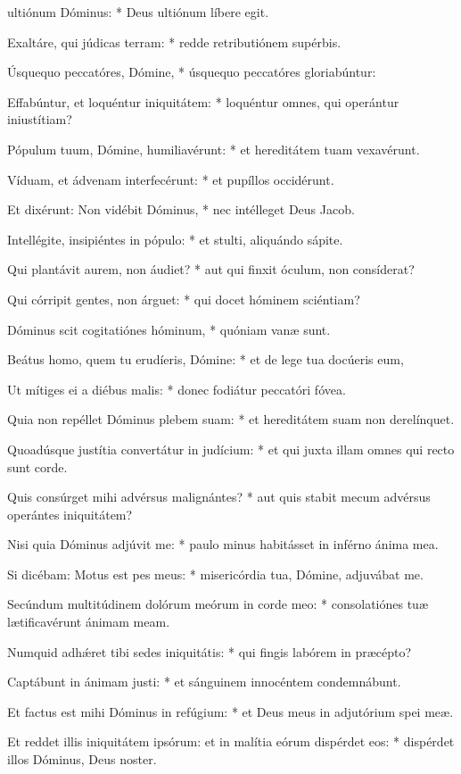 \begin{psalmus}

	 ultiónum Dóminus: * Deus ultiónum líbere egit.

	Exaltáre, qui júdicas terram: * redde retributiónem supérbis.
 
	Úsquequo peccatóres, Dómine, * úsquequo peccatóres gloriabúntur:

	Effabúntur, et loquéntur iniquitátem: * loquéntur omnes, qui operántur iniustítiam?
 
	Pópulum tuum, Dómine, humiliavérunt: * et hereditátem tuam vexavérunt.
 
	Víduam, et ádvenam interfecérunt: * et pupíllos occidérunt.
 
	Et dixérunt: Non vidébit Dóminus, * nec intélleget Deus Jacob.
 
	Intellégite, insipiéntes in pópulo: * et stulti, aliquándo sápite.
 
	Qui plantávit aurem, non áudiet? * aut qui finxit óculum, non consíderat?
 
	Qui córripit gentes, non árguet: * qui docet hóminem sciéntiam?
 
	Dóminus scit cogitatiónes hóminum, * quóniam vanæ sunt.
 
	Beátus homo, quem tu erudíeris, Dómine: * et de lege tua docúeris eum,
 
	Ut mítiges ei a diébus malis: * donec fodiátur peccatóri fóvea.
 
	Quia non repéllet Dóminus plebem suam: * et hereditátem suam non derelínquet.
 
	Quoadúsque justítia convertátur in judícium: * et qui juxta illam omnes qui recto sunt corde.
 
	Quis consúrget mihi advérsus malignántes? * aut quis stabit mecum advérsus operántes iniquitátem?
 
	Nisi quia Dóminus adjúvit me: * paulo minus habitásset in inférno ánima mea.
 
	Si dicébam: Motus est pes meus: * misericórdia tua, Dómine, adjuvábat me.
 
	Secúndum multitúdinem dolórum meórum in corde meo: * consolatiónes tuæ lætificavérunt ánimam meam.
 
	Numquid adhǽret tibi sedes iniquitátis: * qui fingis labórem in præcépto?
 
	Captábunt in ánimam justi: * et sánguinem innocéntem condemnábunt.
 
	Et factus est mihi Dóminus in refúgium: * et Deus meus in adjutórium spei meæ.
 
	Et reddet illis iniquitátem ipsórum: et in malítia eórum dispérdet eos: * dispérdet illos Dóminus, Deus noster.

\end{psalmus}

